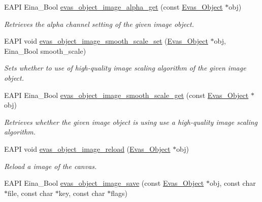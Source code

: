 \begin{DoxyCompactItemize}
EAPI Eina\_\-Bool \hyperlink{group__Evas__Object__Image_gac136f7f65d8529427b1f6da055b47a30}{evas\_\-object\_\-image\_\-alpha\_\-get} (const \hyperlink{group__Evas__Object__Group_ga9e19e6dd1f517a0ba437c0114d3e7c97}{Evas\_\-Object} $\ast$obj)
\begin{DoxyCompactList}\small\item\em Retrieves the alpha channel setting of the given image object. \item\end{DoxyCompactList}\item 
EAPI void \hyperlink{group__Evas__Object__Image_ga670a0cf9176882f0ad339ccb4f37f510}{evas\_\-object\_\-image\_\-smooth\_\-scale\_\-set} (\hyperlink{group__Evas__Object__Group_ga9e19e6dd1f517a0ba437c0114d3e7c97}{Evas\_\-Object} $\ast$obj, Eina\_\-Bool smooth\_\-scale)
\begin{DoxyCompactList}\small\item\em Sets whether to use of high-\/quality image scaling algorithm of the given image object. \item\end{DoxyCompactList}\item 
EAPI Eina\_\-Bool \hyperlink{group__Evas__Object__Image_gae4acc1da719cb38122b92527df24388c}{evas\_\-object\_\-image\_\-smooth\_\-scale\_\-get} (const \hyperlink{group__Evas__Object__Group_ga9e19e6dd1f517a0ba437c0114d3e7c97}{Evas\_\-Object} $\ast$obj)
\begin{DoxyCompactList}\small\item\em Retrieves whether the given image object is using use a high-\/quality image scaling algorithm. \item\end{DoxyCompactList}\item 
EAPI void \hyperlink{group__Evas__Object__Image_ga764bec190c0812f61f5a18f38c9c6a4e}{evas\_\-object\_\-image\_\-reload} (\hyperlink{group__Evas__Object__Group_ga9e19e6dd1f517a0ba437c0114d3e7c97}{Evas\_\-Object} $\ast$obj)
\begin{DoxyCompactList}\small\item\em Reload a image of the canvas. \item\end{DoxyCompactList}\item 
EAPI Eina\_\-Bool \hyperlink{group__Evas__Object__Image_ga68eee07a73dc2f5dc529970f5a1634c4}{evas\_\-object\_\-image\_\-save} (const \hyperlink{group__Evas__Object__Group_ga9e19e6dd1f517a0ba437c0114d3e7c97}{Evas\_\-Object} $\ast$obj, const char $\ast$file, const char $\ast$key, const char $\ast$flags)

\end{DoxyCompactItemize}
